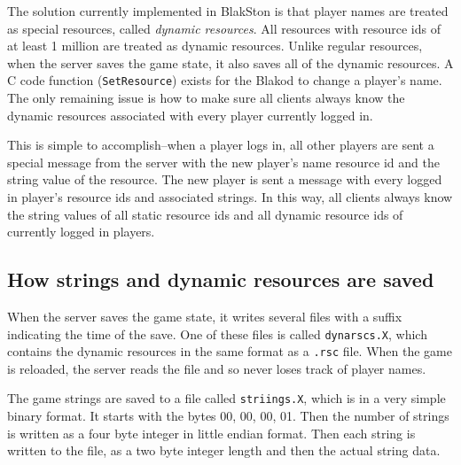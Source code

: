 The solution currently implemented in BlakSton is that player names are
treated as special resources, called \textit{dynamic resources}.  All resources
with resource ids of at least 1 million are treated as dynamic resources.
Unlike regular resources, when the server saves the game state, it also saves
all of the dynamic resources.  A C code function (\texttt{SetResource}) exists
for the Blakod to change a player's name.  The only remaining issue is how to
make sure all clients always know the dynamic resources associated with every
player currently logged in.

This is simple to accomplish--when a player logs in, all other players are sent
a special message from the server with the new player's name resource id and 
the string value of the resource.  The new player is sent a message with
every logged in player's resource ids and associated strings.  In this way,
all clients always know the string values of all static resource ids and
all dynamic resource ids of currently logged in players.

\subsection{How strings and dynamic resources are saved}

When the server saves the game state, it writes several files with a suffix
indicating the time of the save.  One of these files is called \texttt{dynarscs.X},
which contains the dynamic resources in the same format as a \texttt{.rsc} file.
When the game is reloaded, the server reads the file and so never loses track
of player names.

The game strings are saved to a file called \texttt{striings.X}, which is in
a very simple binary format.  It starts with the bytes 00, 00, 00, 01.  Then
the number of strings is written as a four byte integer in little endian format.
Then each string is written to the file, as a two byte integer length and then
the actual string data.
